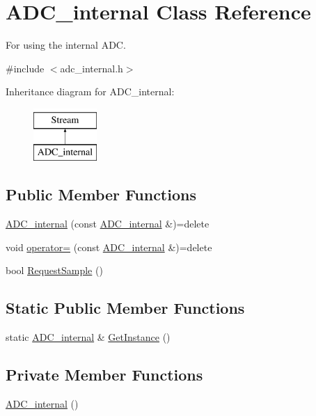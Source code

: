 \hypertarget{class_a_d_c__internal}{}\section{A\+D\+C\+\_\+internal Class Reference}
\label{class_a_d_c__internal}


For using the internal A\+DC.  




{\ttfamily \#include $<$adc\+\_\+internal.\+h$>$}

Inheritance diagram for A\+D\+C\+\_\+internal\+:\begin{figure}[H]
\begin{center}
\leavevmode
\includegraphics[height=2.000000cm]{class_a_d_c__internal}
\end{center}
\end{figure}
\subsection*{Public Member Functions}
\begin{DoxyCompactItemize}
\item 
\hyperlink{class_a_d_c__internal_a7ae0c6415d603f8e4b86c735d4d235f5}{A\+D\+C\+\_\+internal} (const \hyperlink{class_a_d_c__internal}{A\+D\+C\+\_\+internal} \&)=delete
\item 
void \hyperlink{class_a_d_c__internal_a07f6b3f9703f2a5f6815904e371bb124}{operator=} (const \hyperlink{class_a_d_c__internal}{A\+D\+C\+\_\+internal} \&)=delete
\item 
bool \hyperlink{class_a_d_c__internal_accd9d981273a75e739f16232196f0d5e}{Request\+Sample} ()
\end{DoxyCompactItemize}
\subsection*{Static Public Member Functions}
\begin{DoxyCompactItemize}
\item 
static \hyperlink{class_a_d_c__internal}{A\+D\+C\+\_\+internal} \& \hyperlink{class_a_d_c__internal_aebcca86ecf84a34cbbb0994b4defc692}{Get\+Instance} ()
\end{DoxyCompactItemize}
\subsection*{Private Member Functions}
\begin{DoxyCompactItemize}
\item 
\hyperlink{class_a_d_c__internal_a4a34ce3ab980b7ab37672153c86d229a}{A\+D\+C\+\_\+internal} ()
\end{DoxyCompactItemize}
